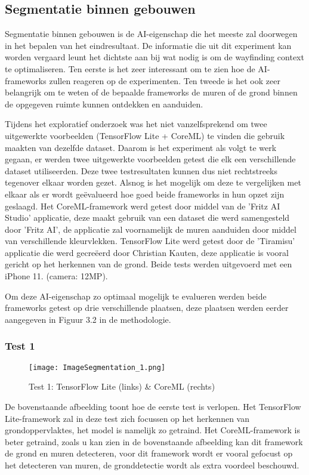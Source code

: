 \subsection{Segmentatie binnen gebouwen}
Segmentatie binnen gebouwen is de AI-eigenschap die het meeste zal doorwegen in het bepalen van het eindresultaat. De informatie die uit dit experiment kan worden vergaard leunt het dichtste aan bij wat nodig is om de wayfinding context te optimaliseren. Ten eerste is het zeer interessant om te zien hoe de AI-frameworks zullen reageren op de experimenten. Ten tweede is het ook zeer belangrijk om te weten of de bepaalde frameworks de muren of de grond binnen de opgegeven ruimte kunnen ontdekken en aanduiden. 

Tijdens het exploratief onderzoek was het niet vanzelfsprekend om twee uitgewerkte voorbeelden (TensorFlow Lite + CoreML) te vinden die gebruik maakten van dezelfde dataset. Daarom is het experiment als volgt te werk gegaan, er werden twee uitgewerkte voorbeelden getest die elk een verschillende dataset utiliseerden. Deze twee testresultaten kunnen dus niet rechtstreeks tegenover elkaar worden gezet. Alsnog is het mogelijk om deze te vergelijken met elkaar als er wordt geëvalueerd hoe goed beide frameworks in hun opzet zijn geslaagd. Het CoreML-framework werd getest door middel van de 'Fritz AI Studio' applicatie, deze maakt gebruik van een dataset die werd samengesteld door 'Fritz AI', de applicatie zal voornamelijk de muren aanduiden door middel van verschillende kleurvlekken. TensorFlow Lite werd getest door de 'Tiramisu' applicatie die werd gecreëerd door Christian Kauten, deze applicatie is vooral gericht op het herkennen van de grond. Beide tests werden uitgevoerd met een iPhone 11. (camera: 12MP).

Om deze AI-eigenschap zo optimaal mogelijk te evalueren werden beide frameworks getest op drie verschillende plaatsen, deze plaatsen werden eerder aangegeven in Figuur 3.2 in de methodologie.

\subsubsection{Test 1}
\begin{figure}[H]
	\centering
	\texttt{[image: ImageSegmentation\_1.png]}
	\caption{Test 1: TensorFlow Lite (links) \& CoreML (rechts)}
\end{figure}

De bovenstaande afbeelding toont hoe de eerste test is verlopen. Het TensorFlow Lite-framework zal in deze test zich focussen op het herkennen van grondoppervlaktes, het model is namelijk zo getraind. Het CoreML-framework is beter getraind, zoals u kan zien in de bovenstaande afbeelding kan dit framework de grond en muren detecteren, voor dit framework wordt er vooral gefocust op het detecteren van muren, de gronddetectie wordt als extra voordeel beschouwd.

